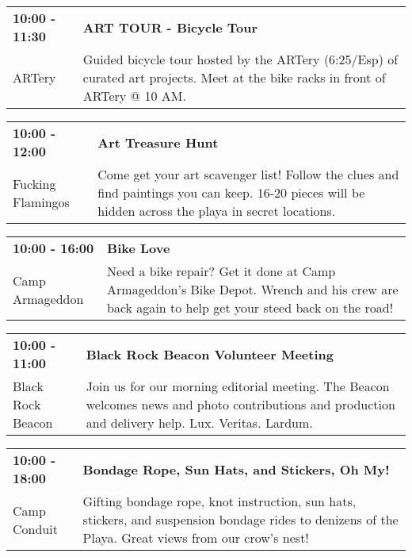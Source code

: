 \begin{tabular}{ p{1in} p{2.2in} }
    \textbf{10:00 - 11:30} & \textbf{ART TOUR - Bicycle Tour} \\
    ARTery \newline  & Guided bicycle tour hosted by the ARTery (6:25/Esp) of curated art projects.   Meet at the bike racks in front of ARTery @ 10 AM. \\
    \hline 
\end{tabular}
    
\begin{tabular}{ p{1in} p{2.2in} }
    \textbf{10:00 - 12:00} & \textbf{Art Treasure Hunt} \\
    Fucking Flamingos \newline  & Come get your art scavenger list! Follow the clues and find paintings you can keep. 16-20 pieces will be hidden across the playa in secret locations. \\
    \hline 
\end{tabular}
    
\begin{tabular}{ p{1in} p{2.2in} }
    \textbf{10:00 - 16:00} & \textbf{Bike Love} \\
    Camp Armageddon \newline  & Need a bike repair? Get it done at Camp Armageddon's Bike Depot. Wrench and his crew are back again to help get your steed back on the road! \\
    \hline 
\end{tabular}
    
\begin{tabular}{ p{1in} p{2.2in} }
    \textbf{10:00 - 11:00} & \textbf{Black Rock Beacon Volunteer Meeting} \\
    Black Rock Beacon \newline  & Join us for our morning editorial meeting. The Beacon welcomes news and photo contributions and production and delivery help. Lux. Veritas. Lardum. \\
    \hline 
\end{tabular}
    
\begin{tabular}{ p{1in} p{2.2in} }
    \textbf{10:00 - 18:00} & \textbf{Bondage Rope, Sun Hats, and Stickers, Oh My!} \\
    Camp Conduit \newline  & Gifting bondage rope, knot instruction, sun hats, stickers, and suspension bondage rides to denizens of the Playa. Great views from our crow's nest! \\
    \hline 
\end{tabular}
    
